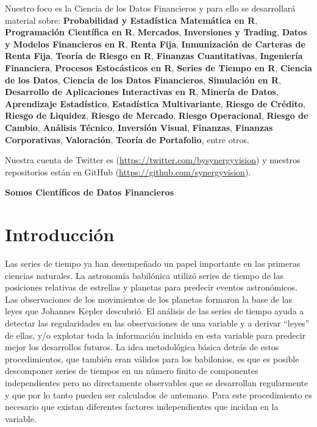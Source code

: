 \documentclass[12pt,]{krantz}
\theoremstyle{definition}
\theoremstyle{definition}
\theoremstyle{definition}
\theoremstyle{remark}
\begin{document}
Nuestro foco es la Ciencia de los Datos Financieros y para ello se
desarrollará material sobre: \textbf{Probabilidad y Estadística
Matemática en R}, \textbf{Programación Científica en R},
\textbf{Mercados}, \textbf{Inversiones y Trading}, \textbf{Datos y
Modelos Financieros en R}, \textbf{Renta Fija}, \textbf{Inmunización de
Carteras de Renta Fija}, \textbf{Teoría de Riesgo en R},
\textbf{Finanzas Cuantitativas}, \textbf{Ingeniería Financiera},
\textbf{Procesos Estocásticos en R}, \textbf{Series de Tiempo en R},
\textbf{Ciencia de los Datos}, \textbf{Ciencia de los Datos
Financieros}, \textbf{Simulación en R}, \textbf{Desarrollo de
Aplicaciones Interactivas en R}, \textbf{Minería de Datos},
\textbf{Aprendizaje Estadístico}, \textbf{Estadística Multivariante},
\textbf{Riesgo de Crédito}, \textbf{Riesgo de Liquidez}, \textbf{Riesgo
de Mercado}, \textbf{Riesgo Operacional}, \textbf{Riesgo de Cambio},
\textbf{Análisis Técnico}, \textbf{Inversión Visual}, \textbf{Finanzas},
\textbf{Finanzas Corporativas}, \textbf{Valoración}, \textbf{Teoría de
Portafolio}, entre otros.

Nuestra cuenta de Twitter es (\url{https://twitter.com/bysynergyvision})
y nuestros repositorios están en GitHub
(\url{https://github.com/synergyvision}).

\textbf{Somos Científicos de Datos Financieros}

\chapter{Introducción}\label{introduccion}

Las series de tiempo ya han desempeñado un papel importante en las
primeras ciencias naturales. La astronomía babilónica utilizó series de
tiempo de las posiciones relativas de estrellas y planetas para predecir
eventos astronómicos. Las observaciones de los movimientos de los
planetas formaron la base de las leyes que Johannes Kepler descubrió. El
análisis de las series de tiempo ayuda a detectar las regularidades en
las observaciones de una variable y a derivar ``leyes'' de ellas, y/o
explotar toda la información incluida en esta variable para predecir
mejor los desarrollos futuros. La idea metodológica básica detrás de
estos procedimientos, que también eran válidos para los babilonios, es
que es posible descomponer series de tiempos en un número finito de
componentes independientes pero no directamente observables que se
desarrollan regularmente y que por lo tanto pueden ser calculados de
antemano. Para este procedimiento es necesario que existan diferentes
factores independientes que incidan en la variable.
\end{document}
